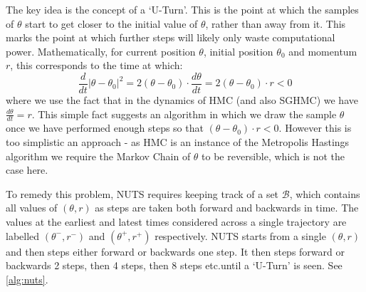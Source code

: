 The key idea is the concept of a `U-Turn'. This is the point at which the samples of $\theta$ start to get closer to the initial value of $\theta$, rather than away from it. This marks the point at which further steps will likely only waste computational power. Mathematically, for current position $\theta$, initial position $\theta_0$ and momentum $r$, this corresponds to the time at which:
$$ \frac{d}{dt} |\theta - \theta_0|^2 = 2(\theta - \theta_0)\cdot\frac{d\theta}{dt} = 2(\theta - \theta_0)\cdot r< 0$$
where we use the fact that in the dynamics of HMC (and also SGHMC) we have $\frac{d\theta}{dt} = r$. This simple fact suggests an algorithm in which we draw the sample $\theta$ once we have performed enough steps so that $(\theta - \theta_0)\cdot r< 0$. However this is too simplistic an approach - as HMC is an instance of the Metropolis Hastings algorithm we require the Markov Chain of $\theta$ to be reversible, which is not the case here.

To remedy this problem, NUTS requires keeping track of a set $\mathcal{B}$, which contains all values of $(\theta, r)$ as steps are taken both forward and backwards in time. The values at the earliest and latest times considered across a single trajectory are labelled  $(\theta^-, r^-)$ and $(\theta^+, r^+)$ respectively. NUTS starts from a single $(\theta, r)$ and then steps either forward or backwards one step. It then steps forward or backwards 2 steps, then 4 steps, then 8 steps etc.\@ until a `U-Turn' is seen. See \cref{alg:nuts}.

